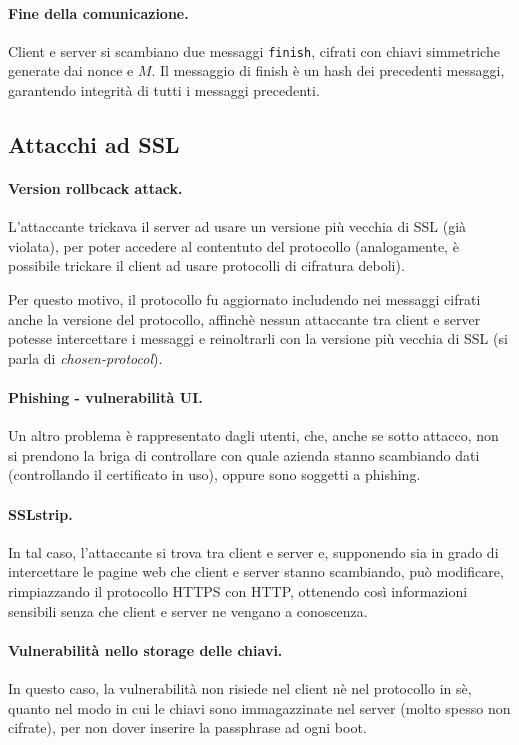 \documentclass[a4paper, 10pt, twoside]{article}
\begin{document}
	\paragraph{Fine della comunicazione.} Client e server si scambiano due messaggi \lstinline{finish}, cifrati con chiavi simmetriche generate dai nonce e $M$. Il messaggio di finish è un hash dei precedenti messaggi, garantendo integrità di tutti i messaggi precedenti.

	\subsection{Attacchi ad SSL}
	\paragraph{Version rollbcack attack.} L'attaccante trickava il server ad usare un versione più vecchia di SSL (già violata), per poter accedere al contentuto del protocollo (analogamente, è possibile trickare il client ad usare protocolli di cifratura deboli).

	Per questo motivo, il protocollo fu aggiornato includendo nei messaggi cifrati anche la versione del protocollo, affinchè nessun attaccante tra client e server potesse intercettare i messaggi e reinoltrarli con la versione più vecchia di SSL (si parla di \textit{chosen-protocol}).

	\paragraph{Phishing - vulnerabilità UI.} Un altro problema è rappresentato dagli utenti, che, anche se sotto attacco, non si prendono la briga di controllare con quale azienda stanno scambiando dati (controllando il certificato in uso), oppure sono soggetti a phishing.

	\paragraph{SSLstrip.} In tal caso, l'attaccante si trova tra client e server e, supponendo sia in grado di intercettare le pagine web che client e server stanno scambiando, può modificare, rimpiazzando il protocollo HTTPS con HTTP, ottenendo così informazioni sensibili senza che client e server ne vengano a conoscenza.

	\paragraph{Vulnerabilità nello storage delle chiavi.} In questo caso, la vulnerabilità non risiede nel client nè nel protocollo in sè, quanto nel modo in cui le chiavi sono immagazzinate nel server (molto spesso non cifrate), per non dover inserire la passphrase ad ogni boot.
\end{document}
